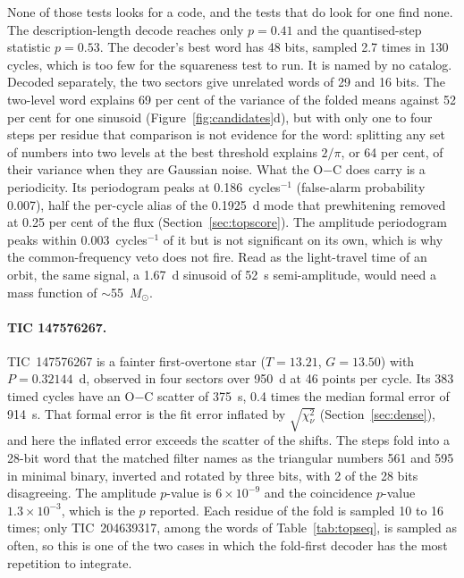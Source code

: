 \documentclass[final,5p]{elsarticle}
\newcommand{\oc}{O$-$C}
\newcommand{\Msun}{\ensuremath{M_\odot}}
\begin{document}
None of those tests looks for a code, and the tests that do look for one find none. The description-length decode reaches only $p=0.41$ and the quantised-step statistic $p=0.53$. The decoder's best word has 48 bits, sampled 2.7 times in 130 cycles, which is too few for the squareness test to run. It is named by no catalog. Decoded separately, the two sectors give unrelated words of 29 and 16 bits. The two-level word explains 69 per cent of the variance of the folded means against 52 per cent for one sinusoid (Figure~\ref{fig:candidates}d), but with only one to four steps per residue that comparison is not evidence for the word: splitting any set of numbers into two levels at the best threshold explains $2/\pi$, or 64 per cent, of their variance when they are Gaussian noise. What the \oc{} does carry is a periodicity. Its periodogram peaks at 0.186~cycles$^{-1}$ (false-alarm probability 0.007), half the per-cycle alias of the 0.1925~d mode that prewhitening removed at 0.25 per cent of the flux (Section~\ref{sec:topscore}). The amplitude periodogram peaks within 0.003~cycles$^{-1}$ of it but is not significant on its own, which is why the common-frequency veto does not fire. Read as the light-travel time of an orbit, the same signal, a 1.67~d sinusoid of 52~s semi-amplitude, would need a mass function of $\sim$55~\Msun{}.

\paragraph{TIC 147576267.} TIC~147576267 is a fainter first-overtone star ($T=13.21$, $G=13.50$) with $P=0.32144$~d, observed in four sectors over 950~d at 46 points per cycle. Its 383 timed cycles have an \oc{} scatter of 375~s, 0.4 times the median formal error of 914~s. That formal error is the fit error inflated by $\sqrt{\chi^2_\nu}$ (Section~\ref{sec:dense}), and here the inflated error exceeds the scatter of the shifts. The steps fold into a 28-bit word that the matched filter names as the triangular numbers 561 and 595 in minimal binary, inverted and rotated by three bits, with 2 of the 28 bits disagreeing. The amplitude $p$-value is $6\times10^{-9}$ and the coincidence $p$-value $1.3\times10^{-3}$, which is the $p$ reported. Each residue of the fold is sampled 10 to 16 times; only TIC~204639317, among the words of Table~\ref{tab:topseq}, is sampled as often, so this is one of the two cases in which the fold-first decoder has the most repetition to integrate.
\end{document}
